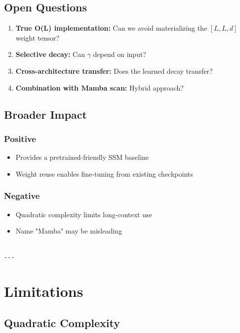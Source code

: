 \subsection{Open Questions}

\begin{enumerate}
\item \textbf{True O(L) implementation:} Can we avoid materializing the $[L, L, d]$
  weight tensor?
\item \textbf{Selective decay:} Can $\gamma$ depend on input?
\item \textbf{Cross-architecture transfer:} Does the learned decay transfer?
\item \textbf{Combination with Mamba scan:} Hybrid approach?

\end{enumerate}
\subsection{Broader Impact}

\subsubsection{Positive}
\begin{itemize}
\item Provides a pretrained-friendly SSM baseline
\item Weight reuse enables fine-tuning from existing checkpoints

\end{itemize}
\subsubsection{Negative}
\begin{itemize}
\item Quadratic complexity limits long-context use
\item Name "Mamba" may be misleading
\end{itemize}
\begin{lstlisting}

---
\end{lstlisting}

\section{Limitations}

\subsection{Quadratic Complexity}


